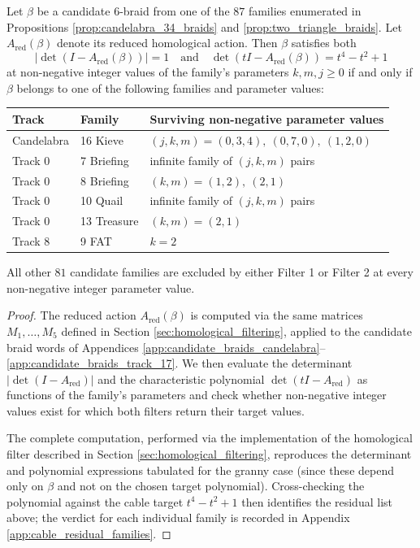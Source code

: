 \begin{prop}\label{prop:cable_filter_outcome}
Let $\beta$ be a candidate 6-braid from one of the $87$ families enumerated in Propositions \ref{prop:candelabra_34_braids} and \ref{prop:two_triangle_braids}.  Let $A_{\text{red}}(\beta)$ denote its reduced homological action.  Then $\beta$ satisfies both
\[
|\det(I - A_{\text{red}}(\beta))| = 1
\quad \text{and} \quad
\det(tI - A_{\text{red}}(\beta)) = t^4 - t^2 + 1
\]
at non-negative integer values of the family's parameters $k, m, j \ge 0$ if and only if $\beta$ belongs to one of the following families and parameter values:
\begin{center}
\begin{tabular}{lll}
\toprule
Track & Family & Surviving non-negative parameter values \\
\midrule
Candelabra & 16 Kieve & $(j,k,m) = (0,3,4),\ (0,7,0),\ (1,2,0)$ \\
Track 0 & 7 Briefing & infinite family of $(j,k,m)$ pairs \\
Track 0 & 8 Briefing & $(k,m) = (1,2),\ (2,1)$ \\
Track 0 & 10 Quail & infinite family of $(j,k,m)$ pairs \\
Track 0 & 13 Treasure & $(k,m) = (2,1)$ \\
Track 8 & 9 FAT & $k = 2$ \\
\bottomrule
\end{tabular}
\end{center}
All other $81$ candidate families are excluded by either Filter 1 or Filter 2 at every non-negative integer parameter value.
\end{prop}

\begin{proof}
The reduced action $A_{\text{red}}(\beta)$ is computed via the same matrices $M_1, \dots, M_5$ defined in Section \ref{sec:homological_filtering}, applied to the candidate braid words of Appendices \ref{app:candidate_braids_candelabra}--\ref{app:candidate_braids_track_17}.  We then evaluate the determinant $|\det(I-A_{\text{red}})|$ and the characteristic polynomial $\det(tI-A_{\text{red}})$ as functions of the family's parameters and check whether non-negative integer values exist for which both filters return their target values.

The complete computation, performed via the implementation of the homological filter described in Section \ref{sec:homological_filtering}, reproduces the determinant and polynomial expressions tabulated for the granny case (since these depend only on $\beta$ and not on the chosen target polynomial).  Cross-checking the polynomial against the cable target $t^4 - t^2 + 1$ then identifies the residual list above; the verdict for each individual family is recorded in Appendix \ref{app:cable_residual_families}.
\end{proof}

